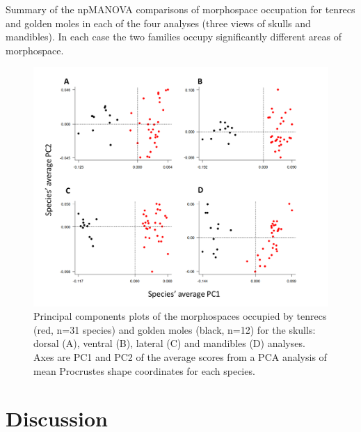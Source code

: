 \documentclass[12pt,a4paper]{article}
\begin{document}
	
	\begin{table}[h]			

	\caption[Summary of npMANOVA comparisons of morphospace occupation for tenrecs and golden moles]
		{Summary of the npMANOVA comparisons of morphospace occupation for tenrecs and golden moles in each of the four analyses (three views of skulls and mandibles). In each case the two families occupy significantly different areas of morphospace.}
	\centering
	 
	\label{tab:npmanova.summary}  
	\end{table}
		
	\begin{figure}[H]
	\centering
	\includegraphics[width=1\linewidth]{figures/FourPlotPCA.png}
	\caption[Principal components plots of the morphospaces occupied by tenrecs and golden moles]
		{Principal components plots of the morphospaces occupied by tenrecs (red, n=31 species) and golden moles (black, n=12) for the skulls: dorsal (A), ventral (B), lateral (C) and mandibles (D) analyses. Axes are PC1 and PC2 of the average scores from a PCA analysis of mean Procrustes shape coordinates for each species. }
	\label{fig:fourPCA}
	\end{figure}


\section{Discussion} 
\end{document}
